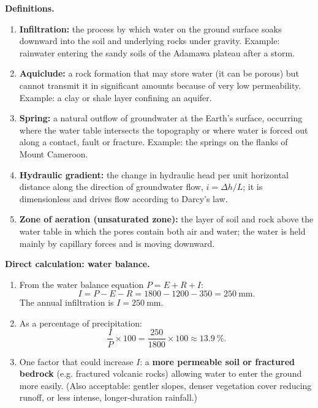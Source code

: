 \documentclass[11pt]{article}
\begin{document}
\begin{corrige}[Exercise 3]
\textbf{Definitions.}
\begin{enumerate}
\item \textbf{Infiltration:} the process by which water on the ground surface soaks downward into the soil and underlying rocks under gravity. Example: rainwater entering the sandy soils of the Adamawa plateau after a storm.
\item \textbf{Aquiclude:} a rock formation that may store water (it can be porous) but cannot transmit it in significant amounts because of very low permeability. Example: a clay or shale layer confining an aquifer.
\item \textbf{Spring:} a natural outflow of groundwater at the Earth's surface, occurring where the water table intersects the topography or where water is forced out along a contact, fault or fracture. Example: the springs on the flanks of Mount Cameroon.
\item \textbf{Hydraulic gradient:} the change in hydraulic head per unit horizontal distance along the direction of groundwater flow, $i = \Delta h / L$; it is dimensionless and drives flow according to Darcy's law.
\item \textbf{Zone of aeration (unsaturated zone):} the layer of soil and rock above the water table in which the pores contain both air and water; the water is held mainly by capillary forces and is moving downward.
\end{enumerate}
\end{corrige}

\begin{corrige}[Exercise 4]
\textbf{Direct calculation: water balance.}
\begin{enumerate}
\item From the water balance equation $P = E + R + I$:
\[ I = P - E - R = 1800 - 1200 - 350 = 250\ \mathrm{mm}. \]
The annual infiltration is $\boxed{I = 250\ \mathrm{mm}}$.
\item As a percentage of precipitation:
\[ \frac{I}{P}\times 100 = \frac{250}{1800}\times 100 \approx 13.9\ \%. \]
\item One factor that could increase $I$: a \textbf{more permeable soil or fractured bedrock} (e.g. fractured volcanic rocks) allowing water to enter the ground more easily. (Also acceptable: gentler slopes, denser vegetation cover reducing runoff, or less intense, longer-duration rainfall.)
\end{enumerate}
\end{corrige}
\end{document}
